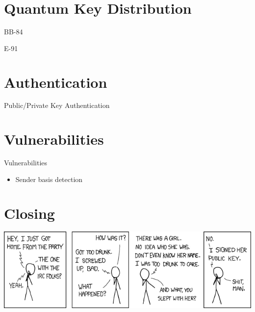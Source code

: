 \documentclass{beamer}
\begin{document}


	\section{Quantum Key Distribution}

	\begin{frame}{BB-84} %

	\end{frame}

	\begin{frame}{E-91} %

	\end{frame}

	\section{Authentication}

	\begin{frame}{Public/Private Key Authentication} %

	\end{frame}

	\section{Vulnerabilities}

	\begin{frame}{Vulnerabilities} %
		\begin{itemize}
			\item Sender basis detection
		\end{itemize}
	\end{frame}

	\section{Closing}

	\begin{frame}
		\begin{center}
		\includegraphics[width=\textwidth]{images/xkcd-responsible_behavior}
		\end{center}
	\end{frame}


	\begin{frame}[plain]\end{frame}
\end{document}
